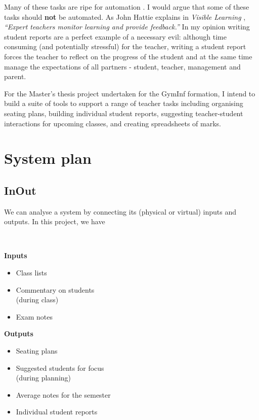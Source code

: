 \documentclass[10pt]{article}
\begin{document}
Many of these tasks are ripe for automation \cite{Swei15}. I would argue that some of these tasks should \textbf{not} be automated. As John Hattie explains in \emph{Visible Learning} \cite{Hat12}, \emph{``Expert teachers monitor learning and provide feedback.''} In my opinion writing student reports are a perfect example of a necessary evil: although time consuming (and potentially stressful) for the teacher, writing a student report forces the teacher to reflect on the progress of the student and at the same time manage the expectations of all partners - student, teacher, management and parent.

For the Master's thesis project undertaken for the GymInf formation, I intend to build a suite of tools to support a range of teacher tasks including organising seating plans, building individual student reports, suggesting teacher-student interactions for upcoming classes, and creating spreadsheets of marks.

\section{System plan}

\subsection{InOut}

We can analyse a system by connecting its (physical or virtual) inputs and outputs. In this project, we have

\

\begin{minipage}[t]{0.45\textwidth}

\textbf{Inputs}

\begin{itemize}
\item Class lists
\item Commentary on students \\
(during class)
\item Exam notes
\end{itemize}


\end{minipage}
\hfill
\vline
\hfill
\begin{minipage}[t]{0.45\textwidth}

\textbf{Outputs}

\begin{itemize}
\item Seating plans
\item Suggested students for focus \\
(during planning)
\item Average notes for the semester
\item Individual student reports
\end{itemize}



\end{minipage}
\end{document}
